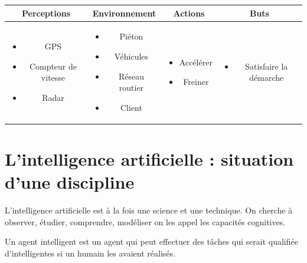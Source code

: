 \documentclass[12pt,a4paper,openany]{book}
\begin{document}
\begin{exemple}
	\begin{tabular}{cccc}
		\textbf{Perceptions} & \textbf{Environnement} & \textbf{Actions} & \textbf{Buts}\\
		\hline
		\begin{minipage}{0.2\textwidth}
			\begin{itemize}
				\item GPS
				\item Compteur de vitesse
				\item Radar
			\end{itemize}
		\end{minipage}
		&
		\begin{minipage}{0.25\textwidth}
			\begin{itemize}
				\item Piéton 
				\item Véhicules
				\item Réseau routier
				\item Client
			\end{itemize}
		\end{minipage}
		&
		\begin{minipage}{0.17\textwidth}
			\begin{itemize}
				\item Accélérer
				\item Freiner
			\end{itemize}
		\end{minipage}
		&
		\begin{minipage}{0.3\textwidth}
			\begin{itemize}
				\item Satisfaire la démarche 
			\end{itemize}
		\end{minipage}
	\end{tabular}
\end{exemple}

\section{L'intelligence artificielle : situation d'une discipline}
L'intelligence artificielle est à la fois une science et une technique. On cherche à observer, étudier, comprendre, modéliser on les appel les
capacités cognitives.

Un agent intelligent est un agent qui peut effectuer des tâches qui serait qualifiée d'intelligentes si un humain les avaient réalisés.
\end{document}
